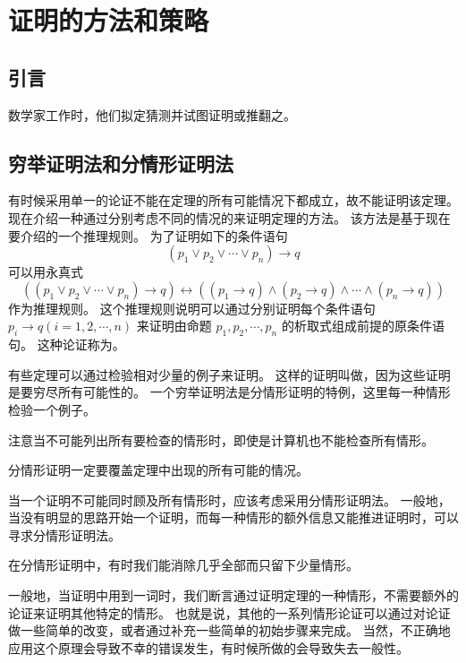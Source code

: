 
\section{证明的方法和策略}
{
    \subsection{引言}
    {
        数学家工作时，他们拟定猜测并试图证明或推翻之。
    }

    \subsection{穷举证明法和分情形证明法}
    {
        有时候采用单一的论证不能在定理的所有可能情况下都成立，故不能证明该定理。
        现在介绍一种通过分别考虑不同的情况的来证明定理的方法。
        该方法是基于现在要介绍的一个推理规则。
        为了证明如下的条件语句
        $$(p_1 \vee p_2 \vee \cdots \vee p_n) \rightarrow q$$
        可以用永真式
        $$((p_1 \vee p_2 \vee \cdots \vee p_n) \rightarrow q) \leftrightarrow ((p_1 \rightarrow q) \wedge (p_2 \rightarrow q) \wedge \cdots \wedge (p_n \rightarrow q))$$
        作为推理规则。
        这个推理规则说明可以通过分别证明每个条件语句 $p_i \rightarrow q(i = 1, 2, \cdots , n)$ 来证明由命题 $p_1, p_2, \cdots , p_n$ 的析取式组成前提的原条件语句。
        这种论证称为。

        {
            有些定理可以通过检验相对少量的例子来证明。
            这样的证明叫做，因为这些证明是要穷尽所有可能性的。
            一个穷举证明法是分情形证明的特例，这里每一种情形检验一个例子。

            注意当不可能列出所有要检查的情形时，即使是计算机也不能检查所有情形。
        }

        {
            分情形证明一定要覆盖定理中出现的所有可能的情况。
        }

        {
            当一个证明不可能同时顾及所有情形时，应该考虑采用分情形证明法。
            一般地，当没有明显的思路开始一个证明，而每一种情形的额外信息又能推进证明时，可以寻求分情形证明法。

            在分情形证明中，有时我们能消除几乎全部而只留下少量情形。
        }

        {
            一般地，当证明中用到一词时，我们断言通过证明定理的一种情形，不需要额外的论证来证明其他特定的情形。
            也就是说，其他的一系列情形论证可以通过对论证做一些简单的改变，或者通过补充一些简单的初始步骤来完成。
            当然，不正确地应用这个原理会导致不幸的错误发生，有时候所做的会导致失去一般性。
        }
    }
}